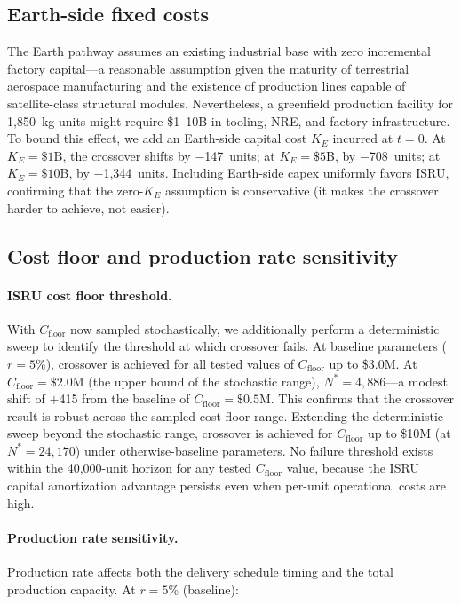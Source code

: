 \documentclass[preprint,12pt]{elsarticle}
\begin{document}
\subsection{Earth-side fixed costs}
\label{sec:earth_capex}

The Earth pathway assumes an existing industrial base with zero incremental factory capital---a reasonable assumption given the maturity of terrestrial aerospace manufacturing and the existence of production lines capable of satellite-class structural modules. Nevertheless, a greenfield production facility for 1{,}850~kg units might require \$1--10B in tooling, NRE, and factory infrastructure. To bound this effect, we add an Earth-side capital cost $K_E$ incurred at $t = 0$. At $K_E = \$1$B, the crossover shifts by $-$147~units; at $K_E = \$5$B, by $-$708~units; at $K_E = \$10$B, by $-$1{,}344~units. Including Earth-side capex uniformly favors ISRU, confirming that the zero-$K_E$ assumption is conservative (it makes the crossover harder to achieve, not easier).

\subsection{Cost floor and production rate sensitivity}
\label{sec:cfloor_prodrate}

\paragraph{ISRU cost floor threshold.} With $C_{\mathrm{floor}}$ now sampled stochastically, we additionally perform a deterministic sweep to identify the threshold at which crossover fails. At baseline parameters ($r = 5\%$), crossover is achieved for all tested values of $C_{\mathrm{floor}}$ up to \$3.0M. At $C_{\mathrm{floor}} = \$2.0$M (the upper bound of the stochastic range), $N^* = 4{,}886$---a modest shift of $+$415 from the baseline of $C_{\mathrm{floor}} = \$0.5$M. This confirms that the crossover result is robust across the sampled cost floor range. Extending the deterministic sweep beyond the stochastic range, crossover is achieved for $C_{\mathrm{floor}}$ up to \$10M (at $N^* = 24{,}170$) under otherwise-baseline parameters. No failure threshold exists within the 40,000-unit horizon for any tested $C_{\mathrm{floor}}$ value, because the ISRU capital amortization advantage persists even when per-unit operational costs are high.

\paragraph{Production rate sensitivity.} Production rate affects both the delivery schedule timing and the total production capacity. At $r = 5\%$ (baseline):
\end{document}
